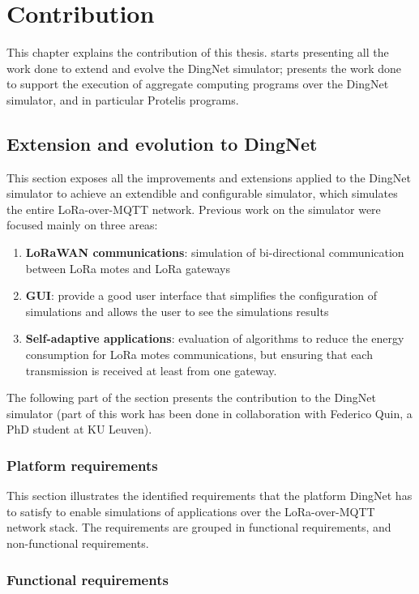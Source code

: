 \chapter{Contribution}
\label{chap:contribution}
This chapter explains the contribution of this thesis.  starts presenting all the work done to extend and evolve the DingNet simulator;  presents  the work done to support the execution of aggregate computing programs over the DingNet simulator, and in particular Protelis programs. 

\section{Extension and evolution to DingNet}
\label{sec:contributionDingNet}
This section exposes all the improvements and extensions applied to the DingNet simulator to achieve an extendible and configurable simulator, which simulates the entire LoRa-over-MQTT network. 
Previous work on the simulator were focused mainly on three areas:
\begin{enumerate}
    \item \textbf{LoRaWAN communications}: simulation of bi-directional communication between LoRa motes and LoRa gateways
    \item \textbf{GUI}: provide a good user interface that simplifies the configuration of simulations and allows the user to see the simulations results
    \item \textbf{Self-adaptive applications}: evaluation of algorithms to reduce the energy consumption for LoRa motes communications, but ensuring that each transmission is received at least from one gateway.
\end{enumerate}
The following part of the section presents the contribution to the DingNet simulator (part of this work has been done in collaboration with Federico Quin, a PhD student at KU Leuven).
\clearpage
\subsection{Platform requirements}

This section illustrates the identified requirements that the platform DingNet has to satisfy to enable simulations of applications over the LoRa-over-MQTT network stack.
The requirements are grouped in functional requirements, and non-functional requirements.

\subsection*{Functional requirements}

